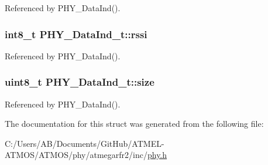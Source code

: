 Referenced by P\-H\-Y\-\_\-\-Data\-Ind().

\hypertarget{struct_p_h_y___data_ind__t_ae39080c0fe21e6c1716222c6231d370b}{
\subsubsection[{rssi}]{\setlength{\rightskip}{0pt plus 5cm}int8\-\_\-t P\-H\-Y\-\_\-\-Data\-Ind\-\_\-t\-::rssi}}\label{struct_p_h_y___data_ind__t_ae39080c0fe21e6c1716222c6231d370b}


Referenced by P\-H\-Y\-\_\-\-Data\-Ind().

\hypertarget{struct_p_h_y___data_ind__t_ae250a8fcfc37e4af4171a8753374a53b}{
\subsubsection[{size}]{\setlength{\rightskip}{0pt plus 5cm}uint8\-\_\-t P\-H\-Y\-\_\-\-Data\-Ind\-\_\-t\-::size}}\label{struct_p_h_y___data_ind__t_ae250a8fcfc37e4af4171a8753374a53b}


Referenced by P\-H\-Y\-\_\-\-Data\-Ind().



The documentation for this struct was generated from the following file\-:\begin{DoxyCompactItemize}
\item 
C\-:/\-Users/\-A\-B/\-Documents/\-Git\-Hub/\-A\-T\-M\-E\-L-\/\-A\-T\-M\-O\-S/\-A\-T\-M\-O\-S/phy/atmegarfr2/inc/\hyperlink{phy_8h}{phy.\-h}\end{DoxyCompactItemize}
